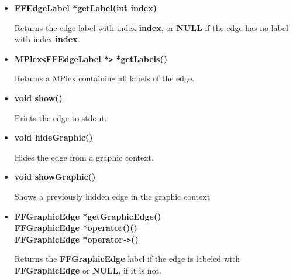 \begin{itemize}
\item{\bf FFEdgeLabel *getLabel(int index)}
  
  Returns the edge label with index {\bf index}, or {\bf NULL} if
  the edge has no label with index {\bf index}.

\item{\bf MPlex\verb|<|FFEdgeLabel *\verb|>| *getLabels()}
  
  Returns a MPlex containing all labels of the edge.

\item{\bf void show()}
  
  Prints the edge to stdout.

\item{\bf void hideGraphic()}
  
  Hides the edge from a graphic context.

\item{\bf void showGraphic()}

Shows a previously hidden edge in the graphic context
  
\item{\bf FFGraphicEdge *getGraphicEdge() \\
    FFGraphicEdge *operator()() \\
    FFGraphicEdge *operator\verb|->|()}
  
  Returns the {\bf FFGraphicEdge} label if the edge is labeled
  with {\bf FFGraphicEdge} or {\bf NULL}, if it is not.

\end{itemize}
